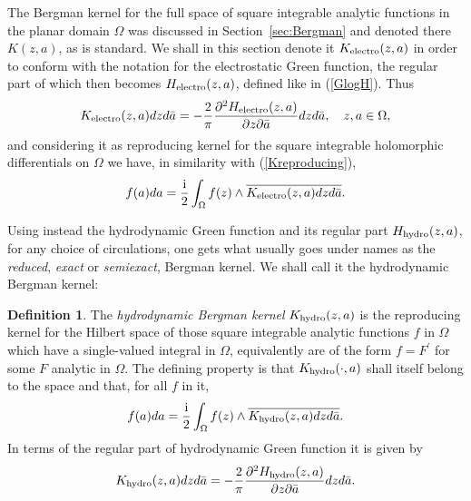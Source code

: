 \documentclass[reqno,12pt]{article}
\theoremstyle{plain}
\theoremstyle{definition}
\newtheorem{definition}{Definition}[section]
\numberwithin{equation}{section}
\numberwithin{figure}{section}
\def\I{\mathrm{i}}
\begin{document}
The {Bergman kernel}  for the full space of square 
integrable analytic functions in the planar domain $\Omega$ was discussed in 
Section~\ref{sec:Bergman} and denoted there $K(z,a)$,
as is standard. We shall in this section denote it
$K_{\rm electro}(z,a)$ in order to conform with the notation for the  electrostatic Green function, the 
 regular part of which then becomes $H_{\rm electro}(z,a)$, defined like in (\ref{GlogH}). Thus
\begin{equation}\label{KHelectro}
K_{\rm electro}(z,a)dzd\bar{a}
=-\frac{2}{\pi}\frac{\partial^2 H_{\rm electro}(z,a)}{\partial z\partial\bar{a}}dzd\bar{a}, \quad z,a\in\Omega,
\end{equation}
and considering it as reproducing kernel for the square integrable holomorphic differentials on $\Omega$
we have, in similarity with (\ref{Kreproducing}),
\begin{equation}\label{Kelectroreproducing}
f(a)da=\frac{\I}{2}\int_\Omega f(z)\wedge \overline{K_{\rm electro}(z,a)dzd\bar{a}}.
\end{equation} 
  
Using instead the hydrodynamic Green function and its regular part $H_{\rm hydro}(z,a)$, for {any} choice of circulations, 
one gets what usually goes under names as the {\it reduced}, {\it exact} or {\it semiexact}, Bergman kernel. We shall call it
the {hydrodynamic} Bergman kernel:
\begin{definition}\label{def:hydrodynamic Bergman} 
The {\it hydrodynamic Bergman kernel} $K_{\rm hydro}(z,a)$ is the reproducing kernel for the Hilbert space of those 
square integrable analytic functions $f$ in $\Omega$ which have a single-valued integral in $\Omega$,
equivalently are of the form $f=F^\prime$ for some $F$ analytic in $\Omega$.
The defining property is that $K_{\rm hydro}(\cdot,a)$ shall itself belong to the space and that, for all $f$ in it, 
\begin{equation}\label{Khydroreproducing}
f(a)da=\frac{\I}{2}\int_\Omega f(z)\wedge \overline{K_{\rm hydro}(z,a)dzd\bar{a}}.
\end{equation}
In terms of the regular part of hydrodynamic Green function it is given by
\begin{equation}\label{Khydro}
K_{\rm hydro}(z,a)dzd\bar{a}
=-\frac{2}{\pi}\frac{\partial^2 H_{\rm hydro}(z,a)}{\partial z\partial\bar{a}}dzd\bar{a}. 
\end{equation}
\end{definition}
\end{document}
